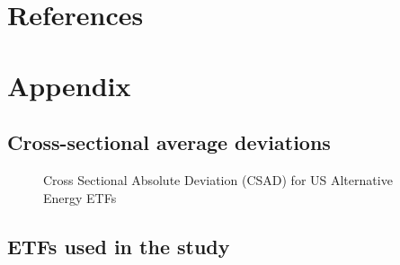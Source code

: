 \documentclass[
  letterpaper,
  DIV=11,
  numbers=noendperiod]{scrartcl}
\begin{document}
\newpage

\section*{References}\label{references}

\renewcommand{\bibsection}{}


\setcounter{section}{0}
\renewcommand{\thesection}{\Alph{section}}

\setcounter{table}{0}
\renewcommand{\thetable}{A\arabic{table}}

\setcounter{figure}{0}
\renewcommand{\thefigure}{A\arabic{figure}}

\newpage

\section{Appendix}\label{appendix}

\subsection{Cross-sectional average
deviations}\label{cross-sectional-average-deviations}

\begin{figure}[H]


\caption{\label{fig-csad}Cross Sectional Absolute Deviation (CSAD) for
US Alternative Energy ETFs}

\end{figure}%

\subsection{ETFs used in the study}\label{etfs-used-in-the-study}
\end{document}
